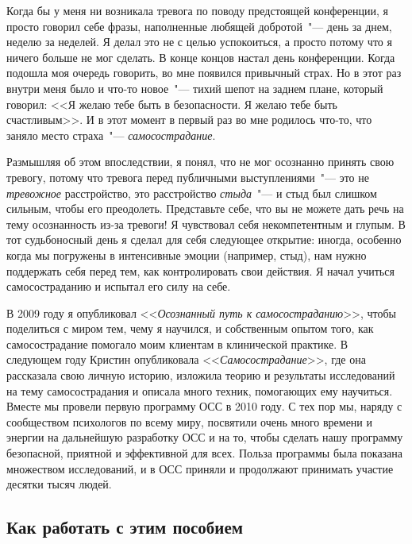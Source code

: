 	Когда бы у меня ни возникала тревога по поводу предстоящей конференции, я просто говорил себе фразы, наполненные любящей добротой~"--- день за днем, неделю за неделей. Я делал это не с целью успокоиться, а просто потому что я ничего больше не мог сделать. В конце концов настал день конференции. Когда подошла моя очередь говорить, во мне появился привычный страх. Но в этот раз внутри меня было и что-то новое~"--- тихий шепот на заднем плане, который говорил: <<Я желаю тебе быть в безопасности. Я желаю тебе быть счастливым>>. И в этот момент в первый раз во мне родилось что-то, что заняло место страха~"--- \emph{самосострадание}.
	
	Размышляя об этом впоследствии, я понял, что не мог осознанно принять свою тревогу, потому что тревога перед публичными выступлениями~"--- это не \emph{тревожное} расстройство, это расстройство \emph{стыда}~"--- и стыд был слишком сильным, чтобы его преодолеть. Представьте себе, что вы не можете дать речь на тему осознанность из-за тревоги! Я чувствовал себя некомпетентным и глупым. В тот судьбоносный день я сделал для себя следующее открытие: иногда, особенно когда мы погружены в интенсивные эмоции (например, стыд), нам нужно поддержать себя перед тем, как контролировать свои действия. Я начал учиться самосостраданию и испытал его силу на себе.
	
	В 2009 году я опубликовал <<\emph{Осознанный путь к самосостраданию}>>, чтобы поделиться с миром тем, чему я научился, и собственным опытом того, как самосострадание помогало моим клиентам в клинической практике. В следующем году Кристин опубликовала <<\emph{Самосострадание}>>, где она рассказала свою личную историю, изложила теорию и результаты исследований на тему самосострадания и описала много техник, помогающих ему научиться. Вместе мы провели первую программу ОСС в 2010 году. С тех пор мы, наряду с сообществом психологов по всему миру, посвятили очень много времени и энергии на дальнейшую разработку ОСС и на то, чтобы сделать нашу программу безопасной, приятной и эффективной для всех. Польза программы была показана множеством исследований, и в ОСС приняли и продолжают принимать участие десятки тысяч людей. 
	
	
	\subsection*{Как работать с этим пособием}
	
